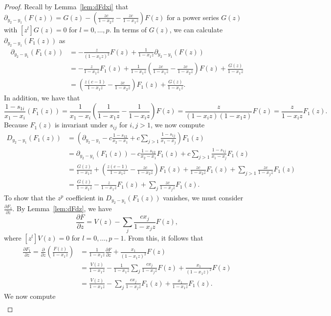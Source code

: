 \documentclass{amsart}
\numberwithin{equation}{section}
\theoremstyle{definition}
\begin{document}
\begin{proof}
Recall by Lemma~\ref{lem:dFdxi} that $\partial_{y_2-y_1}(F(z))= G(z) - \left(\frac{zc}{1-x_2z}-\frac{zc}{1-x_1z}\right)F(z)$ for a power series $G(z)$ with $[z^l]G(z)=0$ for $l=0,\dots,p$. In terms of $G(z)$, we can calculate $\partial_{y_2-y_1}(F_1(z))$ as
\begin{align*}
\partial_{y_2-y_1}(F_1(z))
&=-\frac{z}{(1-x_1z)^2}F(z)+\frac{1}{1-x_1z}\partial_{y_2-y_1}(F(z))\\
&=-\frac{z}{1-x_1z}F_1(z)+\frac{1}{1-x_1z}\left(\frac{zc}{1-x_1z}-\frac{zc}{1-x_2z}\right)F(z)+\frac{G(z)}{1-x_1z}\\
&=\left(\frac{z(c-1)}{1-x_1z}-\frac{zc}{1-x_2z}\right)F_1(z)+\frac{G(z)}{1-x_1z}.
\end{align*}
In addition, we have that 
\[
\frac{1-s_{1i}}{x_1-x_i}(F_1(z))
=\frac{1}{x_1-x_i}\left(\frac{1}{1-x_1z}-\frac{1}{1-x_iz}\right)F(z)=\frac{z}{(1-x_iz)(1-x_1z)}F(z)=\frac{z}{1-x_iz}F_1(z).
\]
Because $F_1(z)$ is invariant under $s_{ij}$ for $i,j > 1$, we now compute
\begin{align*}
D_{y_2-y_1}(F_1(z))&=\left(\partial_{y_2-y_1}-c\frac{1-s_{12}}{x_2-x_1}+c\sum_{j > 1} \frac{1-s_{1j}}{x_1-x_j}\right)F_1(z)\\
&=\partial_{y_2-y_1}(F_1(z))-c\frac{1-s_{12}}{x_2-x_1}F_1(z)+c\sum_{j > 1} \frac{1-s_{1j}}{x_1-x_j}F_1(z)\\
&=\frac{G(z)}{1-x_1z}+\left(\frac{z(c-1)}{1-x_1z}-\frac{zc}{1-x_2z}\right)F_1(z)+\frac{zc}{1-x_2z}F_1(z)+\sum_{j > 1} \frac{zc}{1-x_jz}F_1(z)\\
&=\frac{G(z)}{1-x_1z}-\frac{z}{1-x_1z}F_1(z)+\sum_{j} \frac{zc}{1-x_jz}F_1(z).
\end{align*}
To show that the $z^p$ coefficient in $D_{y_2-y_1}(F_1(z))$ vanishes, we must consider $\frac{\partial F_1}{\partial z}$.  By Lemma~\ref{lem:dFdz}, we have
\[
\frac{\partial F}{\partial z}=V(z) - \sum_j \frac{cx_j}{1-x_jz}F(z),
\]
where $[z^l]V(z)=0$ for $l=0,\dots,p-1$. From this, it follows that
\begin{align*}
\frac{\partial F_1}{\partial z} = \frac{\partial}{\partial z}\left(\frac{F(z)}{1-x_1z}\right) &=\frac{1}{1-x_1z} \frac{\partial F}{\partial z}+\frac{x_1}{(1-x_1z)^2} F(z)\\
&=\frac{V(z)}{1-x_1z}-\frac{1}{1-x_1z}\sum_j \frac{cx_j}{1-x_jz}F(z)+\frac{x_1}{(1-x_1z)^2} F(z)\\
&=\frac{V(z)}{1-x_1z} - \sum_j \frac{cx_j}{1-x_jz}F_1(z)+\frac{x_1}{1-x_1z} F_1(z).
\end{align*}
We now compute
\begin{align*}

\end{align*}
\end{proof}
\end{document}
